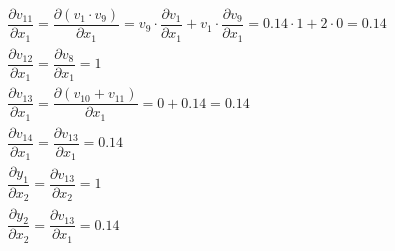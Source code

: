 \documentclass[12pt]{article}
\begin{document}
\begin{enumerate}[label=(\roman*)]
\begin{fleqn}
\begin{gather*}
        \dfrac{\partial v_{11}}{\partial x_{1}} = \dfrac{\partial (v_{1}\cdot v_9)}{\partial x_{1}} = v_9\cdot\dfrac{\partial v_{1}}{\partial x_{1}} + v_1\cdot\dfrac{\partial v_{9}}{\partial x_{1}} = 0.14 \cdot 1 + 2\cdot 0 = 0.14  \\
        \dfrac{\partial v_{12}}{\partial x_{1}} = \dfrac{\partial v_{8}}{\partial x_{1}} = 1  \\
        \dfrac{\partial v_{13}}{\partial x_{1}} = \dfrac{\partial (v_{10} + v_{11})}{\partial x_{1}} = 0 + 0.14 = 0.14  \\
        \dfrac{\partial v_{14}}{\partial x_{1}} = \dfrac{\partial v_{13}}{\partial x_{1}}  = 0.14 \\
        \dfrac{\partial y_{1}}{\partial x_{2}} = \dfrac{\partial v_{13}}{\partial x_{2}}  = 1 \\
        \dfrac{\partial y_{2}}{\partial x_{2}} = \dfrac{\partial v_{13}}{\partial x_{1}}  = 0.14 \\
    \end{gather*}
\end{fleqn}


\end{enumerate}
\end{document}
